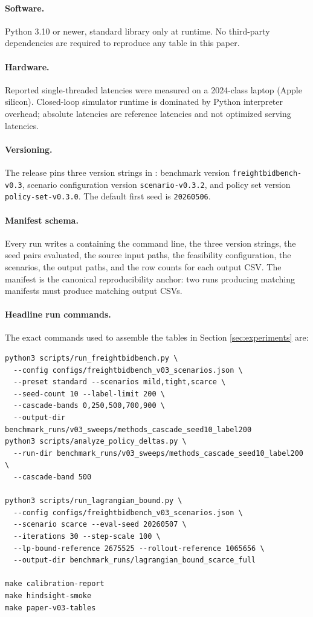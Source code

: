 \documentclass[11pt]{article}
\begin{document}
\paragraph{Software.}
Python 3.10 or newer, standard library only at runtime. No third-party
dependencies are required to reproduce any table in this paper.

\paragraph{Hardware.}
Reported single-threaded latencies were measured on a 2024-class laptop
(Apple silicon). Closed-loop simulator runtime is dominated by Python
interpreter overhead; absolute latencies are reference latencies and not
optimized serving latencies.

\paragraph{Versioning.}
The release pins three version strings in
: benchmark version
\texttt{freightbidbench-v0.3}, scenario configuration version
\texttt{scenario-v0.3.2}, and policy set version
\texttt{policy-set-v0.3.0}. The default first seed is \texttt{20260506}.

\paragraph{Manifest schema.}
Every run writes a  containing the
command line, the three version strings, the seed pairs evaluated, the
source input paths, the feasibility configuration, the scenarios, the
output paths, and the row counts for each output CSV. The manifest is the
canonical reproducibility anchor: two runs producing matching manifests
must produce matching output CSVs.

\paragraph{Headline run commands.}
The exact commands used to assemble the tables in
Section \ref{sec:experiments} are:
\begin{verbatim}
python3 scripts/run_freightbidbench.py \
  --config configs/freightbidbench_v03_scenarios.json \
  --preset standard --scenarios mild,tight,scarce \
  --seed-count 10 --label-limit 200 \
  --cascade-bands 0,250,500,700,900 \
  --output-dir benchmark_runs/v03_sweeps/methods_cascade_seed10_label200
python3 scripts/analyze_policy_deltas.py \
  --run-dir benchmark_runs/v03_sweeps/methods_cascade_seed10_label200 \
  --cascade-band 500

python3 scripts/run_lagrangian_bound.py \
  --config configs/freightbidbench_v03_scenarios.json \
  --scenario scarce --eval-seed 20260507 \
  --iterations 30 --step-scale 100 \
  --lp-bound-reference 2675525 --rollout-reference 1065656 \
  --output-dir benchmark_runs/lagrangian_bound_scarce_full

make calibration-report
make hindsight-smoke
make paper-v03-tables
\end{verbatim}
\end{document}
